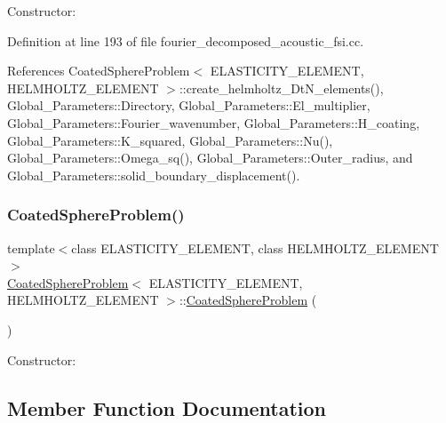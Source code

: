 Constructor\+: 



Definition at line 193 of file fourier\+\_\+decomposed\+\_\+acoustic\+\_\+fsi.\+cc.



References Coated\+Sphere\+Problem$<$ E\+L\+A\+S\+T\+I\+C\+I\+T\+Y\+\_\+\+E\+L\+E\+M\+E\+N\+T, H\+E\+L\+M\+H\+O\+L\+T\+Z\+\_\+\+E\+L\+E\+M\+E\+N\+T $>$\+::create\+\_\+helmholtz\+\_\+\+Dt\+N\+\_\+elements(), Global\+\_\+\+Parameters\+::\+Directory, Global\+\_\+\+Parameters\+::\+El\+\_\+multiplier, Global\+\_\+\+Parameters\+::\+Fourier\+\_\+wavenumber, Global\+\_\+\+Parameters\+::\+H\+\_\+coating, Global\+\_\+\+Parameters\+::\+K\+\_\+squared, Global\+\_\+\+Parameters\+::\+Nu(), Global\+\_\+\+Parameters\+::\+Omega\+\_\+sq(), Global\+\_\+\+Parameters\+::\+Outer\+\_\+radius, and Global\+\_\+\+Parameters\+::solid\+\_\+boundary\+\_\+displacement().

\mbox{\label{classCoatedSphereProblem_ab9c983e7f0bed66f13d59bd65d6d151b}} 
\subsubsection{\texorpdfstring{Coated\+Sphere\+Problem()}{CoatedSphereProblem()}\hspace{0.1cm}{\footnotesize\ttfamily [2/2]}}
{\footnotesize\ttfamily template$<$class E\+L\+A\+S\+T\+I\+C\+I\+T\+Y\+\_\+\+E\+L\+E\+M\+E\+NT, class H\+E\+L\+M\+H\+O\+L\+T\+Z\+\_\+\+E\+L\+E\+M\+E\+NT$>$ \\
\hyperlink{classCoatedSphereProblem}{Coated\+Sphere\+Problem}$<$ E\+L\+A\+S\+T\+I\+C\+I\+T\+Y\+\_\+\+E\+L\+E\+M\+E\+NT, H\+E\+L\+M\+H\+O\+L\+T\+Z\+\_\+\+E\+L\+E\+M\+E\+NT $>$\+::\hyperlink{classCoatedSphereProblem}{Coated\+Sphere\+Problem} (\begin{DoxyParamCaption}{ }\end{DoxyParamCaption})}



Constructor\+: 



\subsection{Member Function Documentation}
\mbox{\label{classCoatedSphereProblem_a77906dadd8ceb1d1d3182f298a0ca2d2}} 
